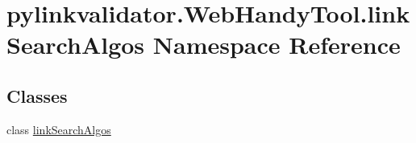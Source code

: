 \hypertarget{namespacepylinkvalidator_1_1_web_handy_tool_1_1link_search_algos}{}\section{pylinkvalidator.\+Web\+Handy\+Tool.\+link\+Search\+Algos Namespace Reference}
\label{namespacepylinkvalidator_1_1_web_handy_tool_1_1link_search_algos}
\subsection*{Classes}
\begin{DoxyCompactItemize}
\item 
class \hyperlink{classpylinkvalidator_1_1_web_handy_tool_1_1link_search_algos_1_1link_search_algos}{link\+Search\+Algos}
\end{DoxyCompactItemize}
